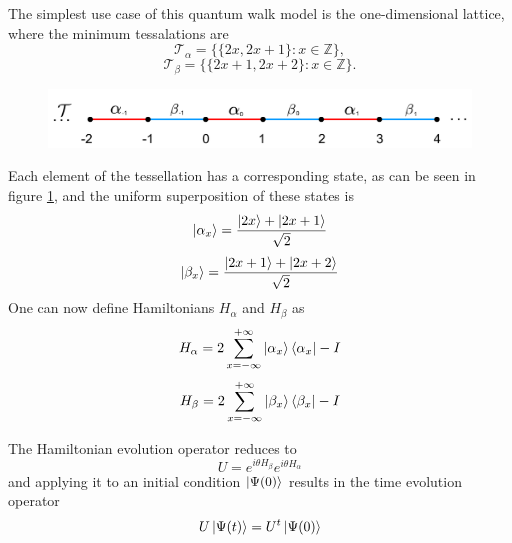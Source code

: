 \documentclass[../../dissertation.tex]{subfiles}
\begin{document}
The simplest use case of this quantum walk model is the one-dimensional
lattice, where the minimum tessalations are
\begin{equation}
	\mathscr{T}_{\alpha}= \{\{2x,2x+1\}\colon x \in \mathbb{Z}\},
\end{equation}
\begin{equation}
	\mathscr{T}_{\beta}= \{\{2x+1,2x+2\}\colon x \in \mathbb{Z}\}.
\end{equation}
\begin{figure}[!h]
	\centering
	\includegraphics[scale=0.40]{img/StagQuantumWalk/tesselation.png}
	\caption{} 
	\label{fig:stagQWTesselation}
\end{figure}
Each element of the tessellation has a corresponding state, as can be seen in
figure \ref{fig:stagQWTesselation}, and the uniform superposition of these
states is
\begin{equation}
	\ket{\alpha_x} = \frac{\ket{2x} + \ket{2x+1}}{\sqrt{2}}
\end{equation}
\begin{equation}
	\ket{\beta_x} = \frac{\ket{2x+1}+\ket{2x+2}}{\sqrt{2}}
\end{equation}
One can now define Hamiltonians $H_\alpha$ and $H_\beta$ as 
\begin{equation}
	H_\alpha = 2\sum_{x=-\infty}^{+\infty}\ket{\alpha_{x}}\bra{\alpha_x} - I
	\label{eq:stagSimulHalpha}
\end{equation}
\begin{equation}
	H_\beta = 2\sum_{x=-\infty}^{+\infty}\ket{\beta_{x}}\bra{\beta_x} - I
	\label{eq:stagSimulHbeta}
\end{equation}\par
The Hamiltonian evolution operator reduces to
\begin{equation}
	U = e^{i\theta H_\beta}e^{i\theta H_\alpha}
	\label{eq:stagSimulUniOp}
\end{equation}
and applying it to an initial condition $\ket{\Psi(0)}$ results in the time
evolution operator
\begin{equation}
	U\ket{\Psi(t)} = U^t\ket{\Psi(0)}
\end{equation}\par
\end{document}
